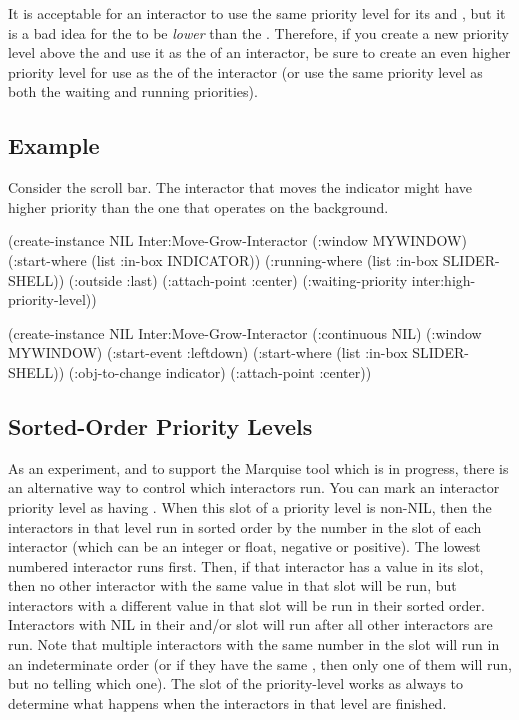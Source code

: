 It is acceptable for an interactor to use the same priority level for its
 and , but it is a bad idea for
the   to be {\it lower} than the .
Therefore, if you create a new priority level above the
and use it as the  of an interactor, be sure to
create an even higher priority level for use as the 
of the interactor (or use the same priority level as both the waiting and
running priorities).

\subsection{Example}
\label{movegrowexample1}

Consider the scroll bar.  The interactor
that moves the indicator might have higher priority than the one that
operates on the background.
\begin{programexample}
(create-instance NIL Inter:Move-Grow-Interactor
   (:window MYWINDOW)
   (:start-where (list :in-box INDICATOR))
   (:running-where (list :in-box SLIDER-SHELL))
   (:outside :last)
   (:attach-point :center)
   (:waiting-priority inter:high-priority-level))

(create-instance NIL Inter:Move-Grow-Interactor
   (:continuous NIL)
   (:window MYWINDOW)
   (:start-event :leftdown)
   (:start-where (list :in-box SLIDER-SHELL))
   (:obj-to-change indicator)
   (:attach-point :center))
\end{programexample}


\subsection{Sorted-Order Priority Levels}
\label{sorted-sec}

As an experiment, and to support the Marquise tool which is in
progress, there is an alternative way to control which interactors run.
You can mark an interactor priority level as having
.  When this slot of a priority level is
non-NIL, then the interactors in that level run in sorted order by the
number in the  slot of each interactor (which can be an
integer or float, negative or positive).  The lowest numbered
interactor runs first.  Then, if that interactor has a value in its
 slot, then no other interactor with the same value
in that slot will be run, but interactors with a different value in
that slot will be run in their sorted order.  Interactors with NIL in
their  and/or  slot will run after all
other interactors are run.  Note that multiple interactors with the
same number in the  slot will run in an indeterminate order
(or if they have the same , then only one of them
will run, but no telling which one).  The  slot of the
priority-level works as always to determine what happens when the
interactors in that level are finished.



